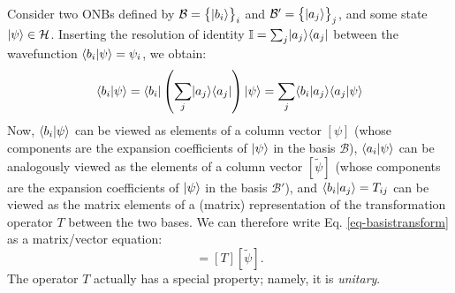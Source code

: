 Consider two ONBs defined by $\mathcal{B} = \set{\lvert b_i \rangle}_i$ and $\mathcal{B}' = \set{\lvert a_j \rangle}_j$, and some state $\lvert \psi \rangle \in \mathcal{H}$. Inserting the resolution of identity $\mathbb{I} = \sum_j \lvert a_j \rangle \langle a_j \rvert$ between the wavefunction $\langle b_i \lvert \psi \rangle = \psi_i$, we obtain:
\begin{equation}\label{eq-basistransform}
    \langle b_i \lvert \psi \rangle = \langle b_i \rvert\left(\sum_j \lvert a_j \rangle \langle a_j \rvert\right)\lvert \psi \rangle = \sum_j \langle b_i \lvert a_j \rangle \langle a_j \lvert \psi \rangle
\end{equation}
Now, $\langle b_i \lvert \psi \rangle$ can be viewed as elements of a column vector $[\psi]$ (whose components are the expansion coefficients of $\lvert \psi \rangle$ in the basis $\mathcal{B}$), $\langle a_i \lvert \psi \rangle$ can be analogously viewed as the elements of a column vector $[\tilde{\psi}]$ (whose components are the expansion coefficients of $\lvert \psi \rangle$ in the basis $\mathcal{B}'$), and $\langle b_i \lvert a_j \rangle = T_{ij}$ can be viewed as the matrix elements of a (matrix) representation of the transformation operator $T$ between the two bases. We can therefore write Eq. \eqref{eq-basistransform} as a matrix/vector equation:
\begin{equation}
    [\psi] = [T][\tilde{\psi}].
\end{equation}
The operator $T$ actually has a special property; namely, it is \emph{unitary}.

